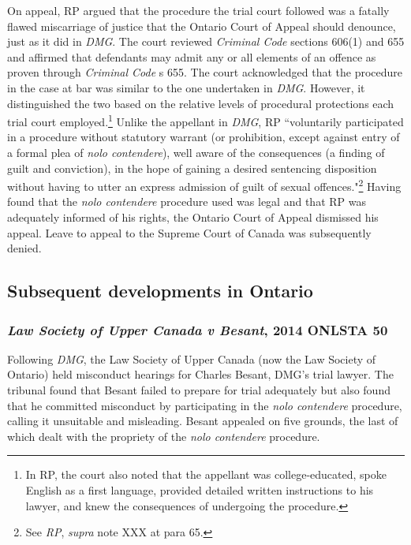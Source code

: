 On appeal, RP argued that the procedure the trial court followed was a fatally flawed miscarriage of justice that the Ontario Court of Appeal should denounce, just as it did in \textit{DMG}. The court reviewed \textit{Criminal Code} sections 606(1) and 655 and affirmed that defendants may admit any or all elements of an offence as proven through \textit{Criminal Code} s 655. The court acknowledged that the procedure in the case at bar was similar to the one undertaken in \textit{DMG}. However, it distinguished the two based on the relative levels of procedural protections each trial court employed.\footnote{In RP, the court also noted that the appellant was college-educated, spoke English as a first language, provided detailed written instructions to his lawyer, and knew the consequences of undergoing the procedure.} Unlike the appellant in \textit{DMG}, RP ``voluntarily participated in a procedure without statutory warrant (or prohibition, except against entry of a formal plea of \textit{nolo contendere}), well aware of the consequences (a finding of guilt and conviction), in the hope of gaining a desired sentencing disposition without having to utter an express admission of guilt of sexual offences."\footnote{See \textit{RP}, \textit{supra} note XXX at para 65.} Having found that the \textit{nolo contendere} procedure used was legal and that RP was adequately informed of his rights, the Ontario Court of Appeal dismissed his appeal. Leave to appeal to the Supreme Court of Canada was subsequently denied.

\subsection{Subsequent developments in Ontario}

\subsubsection{\textit{Law Society of Upper Canada v Besant}, 2014 ONLSTA 50}

Following \textit{DMG}, the Law Society of Upper Canada (now the Law Society of Ontario) held misconduct hearings for Charles Besant, DMG's trial lawyer. The tribunal found that Besant failed to prepare for trial adequately but also found that he committed misconduct by participating in the \textit{nolo contendere} procedure, calling it unsuitable and misleading. Besant appealed on five grounds, the last of which dealt with the propriety of the \textit{nolo contendere} procedure.

